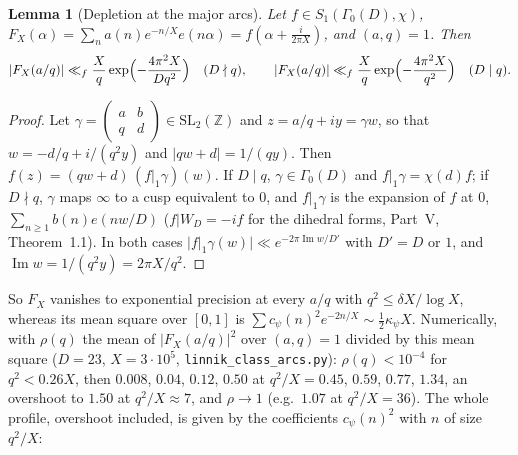 ﻿\documentclass[11pt]{amsart}
\newtheorem{lemma}[theorem]{Lemma}
\theoremstyle{remark}
\newcommand{\Z}{\mathbb Z}
\begin{document}
\begin{lemma}[Depletion at the major arcs]\label{lem:depletion}
Let $f\in S_1(\Gamma_0(D),\chi)$, $F_X(\alpha)=\sum_na(n)e^{-n/X}e(n\alpha)=f(\alpha+\frac i{2\pi X})$, and $(a,q)=1$. Then
\[
|F_X(a/q)|\ll_f\frac Xq\exp\Bigl(-\frac{4\pi^2X}{Dq^2}\Bigr)\quad(D\nmid q),\qquad |F_X(a/q)|\ll_f\frac Xq\exp\Bigl(-\frac{4\pi^2X}{q^2}\Bigr)\quad(D\mid q).
\]
\end{lemma}
\begin{proof}
Let $\gamma=\left(\begin{smallmatrix}a&b\\q&d\end{smallmatrix}\right)\in\mathrm{SL}_2(\Z)$ and $z=a/q+iy=\gamma w$, so that $w=-d/q+i/(q^2y)$ and $|qw+d|=1/(qy)$. Then $f(z)=(qw+d)\,(f|_1\gamma)(w)$. If $D\mid q$, $\gamma\in\Gamma_0(D)$ and $f|_1\gamma=\chi(d)f$; if $D\nmid q$, $\gamma$ maps $\infty$ to a cusp equivalent to $0$, and $f|_1\gamma$ is the expansion of $f$ at $0$, $\sum_{n\ge1}b(n)e(nw/D)$ ($f|W_D=-if$ for the dihedral forms, Part~V, Theorem~1.1). In both cases $|f|_1\gamma(w)|\ll e^{-2\pi\operatorname{Im}w/D'}$ with $D'=D$ or $1$, and $\operatorname{Im}w=1/(q^2y)=2\pi X/q^2$.
\end{proof}

So $F_X$ vanishes to exponential precision at every $a/q$ with $q^2\le\delta X/\log X$, whereas its mean square over $[0,1]$ is $\sum c_\psi(n)^2e^{-2n/X}\sim\frac12\kappa_\psi X$. Numerically, with $\rho(q)$ the mean of $|F_X(a/q)|^2$ over $(a,q)=1$ divided by this mean square ($D=23$, $X=3\cdot10^5$, \texttt{linnik\_class\_arcs.py}): $\rho(q)<10^{-4}$ for $q^2<0.26X$, then $0.008$, $0.04$, $0.12$, $0.50$ at $q^2/X=0.45$, $0.59$, $0.77$, $1.34$, an overshoot to $1.50$ at $q^2/X\approx7$, and $\rho\to1$ (e.g.\ $1.07$ at $q^2/X=36$). The whole profile, overshoot included, is given by the coefficients $c_\psi(n)^2$ with $n$ of size $q^2/X$:
\end{document}
